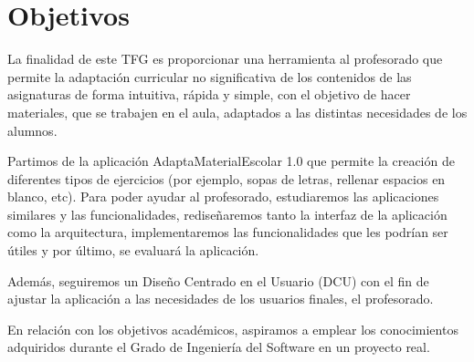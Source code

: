 \section{Objetivos}\label{cap:objetivos}
La finalidad de este TFG es proporcionar una herramienta al profesorado que permite la adaptación curricular no significativa de los contenidos de las asignaturas de forma intuitiva, rápida y simple, con el objetivo de hacer materiales, que se trabajen en el aula, adaptados a las distintas necesidades de los alumnos.

Partimos de la aplicación AdaptaMaterialEscolar 1.0  que permite la creación de diferentes tipos de ejercicios (por ejemplo, sopas de letras, rellenar espacios en blanco, etc). Para poder ayudar al profesorado, estudiaremos las aplicaciones similares y las funcionalidades, rediseñaremos tanto la interfaz de la aplicación como la arquitectura, implementaremos las funcionalidades que les podrían ser útiles y por último, se evaluará la aplicación.

Además, seguiremos un Diseño Centrado en el
Usuario (DCU) con el fin de ajustar la aplicación a las necesidades de los usuarios finales, el profesorado.
 
En relación con los objetivos académicos, aspiramos a emplear los conocimientos adquiridos durante el Grado de Ingeniería del Software en un proyecto real.



